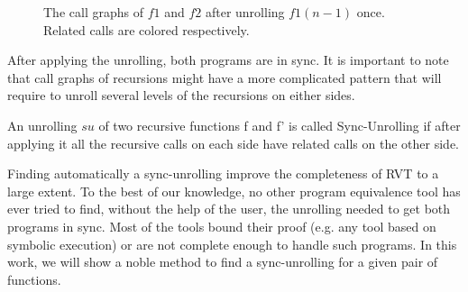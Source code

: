 \begin{figure}
\begin{minipage}{.2\textwidth}
\end{minipage}
\hspace{5cm}
\begin{minipage}{.2\textwidth}
\end{minipage}
\caption{The call graphs of $f1$ and $f2$ after unrolling $f1(n-1)$ once. Related calls are colored respectively.}
\label{fig:f1f2cgunrolled}
\end{figure}
After applying the unrolling, both programs are in sync. It is important to note that call graphs of recursions might have a more complicated pattern that will require to unroll several levels of the recursions on either sides. 
\begin{definition}
An unrolling $su$ of two recursive functions f and f' is called Sync-Unrolling if after applying it all the recursive calls on each side have related calls on the other side.
\end{definition}
Finding automatically a sync-unrolling improve the completeness of RVT to a large extent. To the best of our knowledge, no other program equivalence tool has ever tried to find, without the help of the user, the unrolling needed to get both programs in sync. Most of the tools bound their proof (e.g. any tool based on symbolic execution) or are not complete enough to handle such programs. In this work, we will show a noble method to find a sync-unrolling for a given pair of functions.

